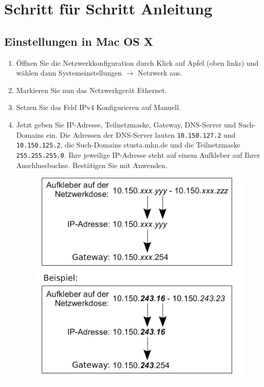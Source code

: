 \documentclass[a4paper,12pt,draft]{scrartcl}
\begin{document}
\section*{Schritt für Schritt Anleitung}
\subsection*{Einstellungen in Mac OS X}
\begin{enumerate}
    \item Öffnen Sie die Netzwerkkonfiguration durch Klick auf Apfel (oben links) und wählen dann Systemeinstellungen $\rightarrow$ Netzwerk aus.
    \item Markieren Sie nun das Netzwerkgerät Ethernet.
    \item Setzen Sie das Feld IPv4 Konfigurieren auf Manuell.
    \item Jetzt geben Sie IP-Adresse, Teilnetzmaske, Gateway, DNS-Server und Such-Domains ein. Die Adressen der DNS-Server lauten \nolinkurl{10.150.127.2} und \nolinkurl{10.150.125.2}, die Such-Domains stusta.mhn.de und die Teilnetzmaske \nolinkurl{255.255.255.0}. Ihre jeweilige IP-Adresse steht auf einem Aufkleber auf Ihrer Anschlussbuchse. Bestätigen Sie mit Anwenden.
      \begin{figure}[h!]
      \centering
        \begin{minipage}[c]{0.38\linewidth}
          \centering
          \includegraphics[width=\linewidth,keepaspectratio]{Bilder/IP_Gerneric}

\end{minipage}
\end{figure}
\end{enumerate}
\end{document}
